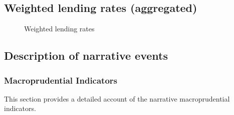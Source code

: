 \documentclass[
  letterpaper,
  DIV=11,
  numbers=noendperiod]{scrartcl}
\begin{document}
\subsection{Weighted lending rates
(aggregated)}\label{weighted-lending-rates-aggregated}

\begin{figure}[H]


\caption{\label{fig-bank_interest_rates}Weighted lending rates}

\end{figure}%

\newpage

\subsection{Description of narrative
events}\label{description-of-narrative-events}

\subsubsection{Macroprudential
Indicators}\label{macroprudential-indicators}

This section provides a detailed account of the narrative
macroprudential indicators.
\end{document}
